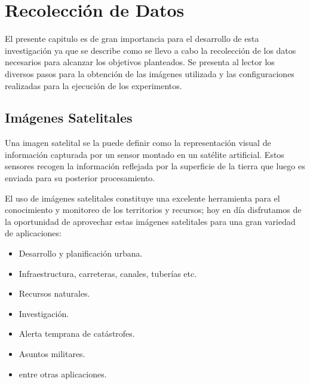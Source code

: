 \chapter{Recolección de Datos}\label{chap:recoleccion}

El presente capitulo es de gran importancia para el desarrollo de esta investigación ya que se describe como se llevo a cabo la recolección de los datos necesarios para alcanzar los objetivos planteados. Se presenta al lector los diversos pasos para la obtención de las imágenes utilizada y  las configuraciones realizadas para la ejecución de los experimentos.

\section{Imágenes Satelitales}\label{sec:imagen_satelitales}

Una imagen satelital se la puede definir como la representación visual de información capturada por un sensor montado en un satélite artificial. Estos sensores recogen la información reflejada por la superficie de la tierra que luego es enviada para su posterior procesamiento.

El uso de imágenes satelitales constituye una excelente herramienta para el conocimiento y monitoreo de los territorios y recursos; hoy en día disfrutamos de la oportunidad de aprovechar estas imágenes satelitales para una gran variedad de aplicaciones:
\begin{itemize}
	\item Desarrollo y planificación urbana.
	\item Infraestructura, carreteras, canales, tuberías etc.
	\item Recursos naturales.
	\item Investigación.
	\item Alerta temprana de catástrofes.
	\item Asuntos militares.
	\item entre otras aplicaciones.
\end{itemize}


